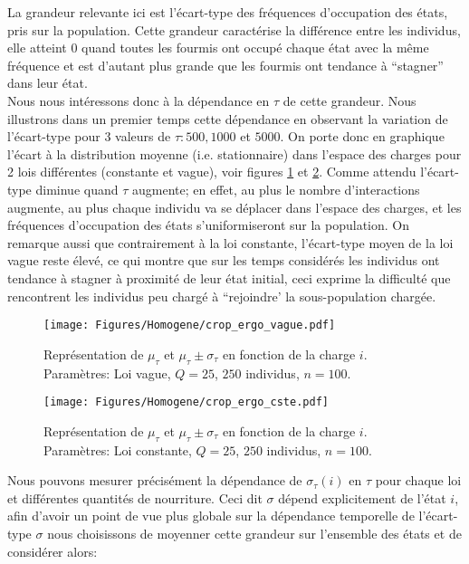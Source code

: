 La grandeur relevante ici est l'écart-type des fréquences d'occupation des états, pris sur la population. Cette grandeur caractérise la différence entre les individus, elle atteint 0 quand toutes les fourmis ont occupé chaque état avec la même fréquence et est d'autant plus grande que les fourmis ont tendance à ``stagner'' dans leur état.  \\

Nous nous intéressons donc à la dépendance en $\tau$ de cette grandeur. Nous illustrons dans un premier temps cette dépendance en observant la variation de l'écart-type pour 3 valeurs de $\tau: 500, 1000$ et $5000$. On porte donc en graphique l'écart à la distribution moyenne (i.e. stationnaire) dans l'espace des charges pour 2 lois différentes (constante et vague), voir figures \ref{ergo_vague} et \ref{ergo_cste}. Comme attendu l'écart-type diminue quand $\tau$ augmente; en effet, au plus le nombre d'interactions augmente, au plus chaque individu va se déplacer dans l'espace des charges, et les fréquences d'occupation des états s'uniformiseront sur la population. On remarque aussi que contrairement à la loi constante, l'écart-type moyen de la loi vague reste élevé, ce qui montre que sur les temps considérés les individus ont tendance à stagner à proximité de leur état initial, ceci exprime la difficulté que rencontrent les individus peu chargé à ``rejoindre' la sous-population chargée.  \\



\begin{figure}[h]
\centering
\texttt{[image: Figures/Homogene/crop\_ergo\_vague.pdf]}
\caption{Représentation de $\mu_{\tau}$ et $\mu_{\tau}\pm \sigma_{\tau}$ en fonction de la charge $i$. Paramètres: Loi vague, $Q=25$, $250$ individus, $n=100$.}
\label{ergo_vague}
\end{figure}

\begin{figure}[h]
\centering
\texttt{[image: Figures/Homogene/crop\_ergo\_cste.pdf]}
\caption{Représentation de $\mu_{\tau}$ et $\mu_{\tau}\pm \sigma_{\tau}$ en fonction de la charge $i$. Paramètres: Loi constante, $Q=25$, $250$ individus, $n=100$.}
\label{ergo_cste}
\end{figure}


Nous pouvons mesurer précisément la dépendance de $\sigma_{\tau}(i)$ en $\tau$ pour chaque loi et différentes quantités de nourriture. Ceci dit $\sigma$ dépend explicitement de l'état $i$, afin d'avoir un point de vue plus globale sur la dépendance temporelle de l'écart-type $\sigma$ nous choisissons de moyenner cette grandeur sur l'ensemble des états et de considérer alors:

